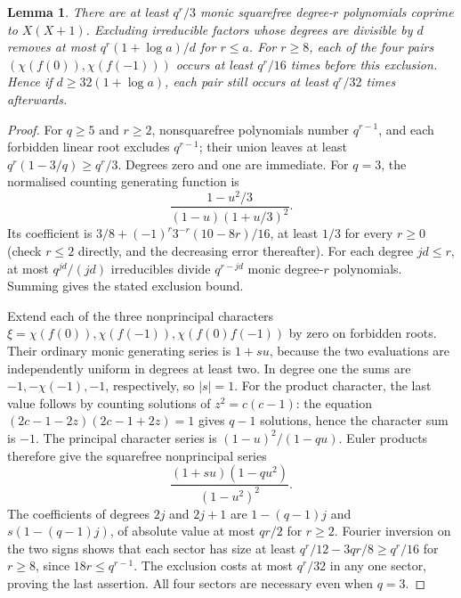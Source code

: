 \documentclass[11pt]{article}
\newtheorem{lemma}[theorem]{Lemma}
\begin{document}
\begin{lemma}\label{sectors}
There are at least $q^r/3$ monic squarefree degree-$r$ polynomials coprime to $X(X+1)$. Excluding irreducible factors whose degrees are divisible by $d$ removes at most $q^r(1+\log a)/d$ for $r\le a$. For $r\ge8$, each of the four pairs $(\chi(f(0)),\chi(f(-1)))$ occurs at least $q^r/16$ times before this exclusion. Hence if $d\ge32(1+\log a)$, each pair still occurs at least $q^r/32$ times afterwards.
\end{lemma}
\begin{proof}
For $q\ge5$ and $r\ge2$, nonsquarefree polynomials number $q^{r-1}$, and each forbidden linear root excludes $q^{r-1}$; their union leaves at least $q^r(1-3/q)\ge q^r/3$. Degrees zero and one are immediate. For $q=3$, the normalised counting generating function is
\[
\frac{1-u^2/3}{(1-u)(1+u/3)^2}.
\]
Its coefficient is $3/8+(-1)^r3^{-r}(10-8r)/16$, at least $1/3$ for every $r\ge0$ (check $r\le2$ directly, and the decreasing error thereafter). For each degree $jd\le r$, at most $q^{jd}/(jd)$ irreducibles divide $q^{r-jd}$ monic degree-$r$ polynomials. Summing gives the stated exclusion bound.

Extend each of the three nonprincipal characters $\xi=\chi(f(0)),\chi(f(-1)),\chi(f(0)f(-1))$ by zero on forbidden roots. Their ordinary monic generating series is $1+s u$, because the two evaluations are independently uniform in degrees at least two. In degree one the sums are $-1,-\chi(-1),-1$, respectively, so $|s|=1$. For the product character, the last value follows by counting solutions of $z^2=c(c-1)$: the equation $(2c-1-2z)(2c-1+2z)=1$ gives $q-1$ solutions, hence the character sum is $-1$. The principal character series is $(1-u)^2/(1-qu)$. Euler products therefore give the squarefree nonprincipal series
\[
\frac{(1+su)(1-qu^2)}{(1-u^2)^2}.
\]
The coefficients of degrees $2j$ and $2j+1$ are $1-(q-1)j$ and $s(1-(q-1)j)$, of absolute value at most $qr/2$ for $r\ge2$. Fourier inversion on the two signs shows that each sector has size at least $q^r/12-3qr/8\ge q^r/16$ for $r\ge8$, since $18r\le q^{r-1}$. The exclusion costs at most $q^r/32$ in any one sector, proving the last assertion. All four sectors are necessary even when $q=3$.
\end{proof}
\end{document}
